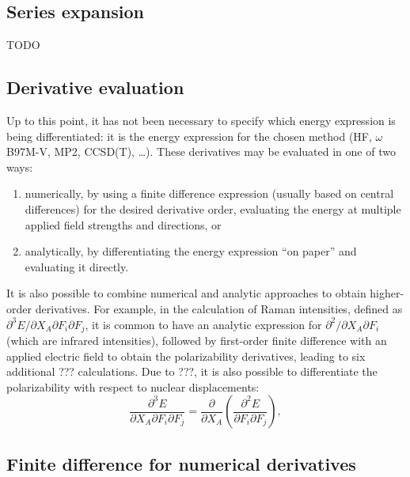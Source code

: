 \documentclass[%
class = book,%
crop = false,%
float = true,%
multi = true,%
preview = false,%
]{standalone}
\begin{document}
\subsection{Series expansion}
\label{ssec:series-expansion}

TODO

\subsection{Derivative evaluation}
\label{ssec:derivative-evaluation}

Up to this point, it has not been necessary to specify which energy expression is being differentiated: it is the energy expression for the chosen method (HF, \(\omega\)B97M-V, MP2, CCSD(T), \dots). These derivatives may be evaluated in one of two ways:
\begin{enumerate}
\item numerically, by using a finite difference expression (usually based on central differences) for the desired derivative order, evaluating the energy at multiple applied field strengths and directions, or
\item analytically, by differentiating the energy expression ``on paper'' and evaluating it directly.
\end{enumerate}
It is also possible to combine numerical and analytic approaches to obtain higher-order derivatives. For example, in the calculation of Raman intensities, defined as \(\partial^{3} E / \partial X_{A} \partial F_{i} \partial F_{j}\), it is common to have an analytic expression for \(\partial^{2} / \partial X_{A} \partial F_{i}\) (which are infrared intensities), followed by first-order finite difference with an applied electric field to obtain the polarizability derivatives, leading to six additional ??? calculations. Due to ???, it is also possible to differentiate the polarizability with respect to nuclear displacements:
\begin{equation}
  \frac{\partial^{3} E}{\partial X_{A} \partial F_{i} \partial F_{j}} = \frac{\partial}{\partial X_{A}} \left( \frac{\partial^{2} E}{\partial F_{i} \partial F_{j}} \right),
\end{equation}


\subsection{Finite difference for numerical derivatives}
\label{ssec:finite-difference-for-numerical-derivatives}
\end{document}
